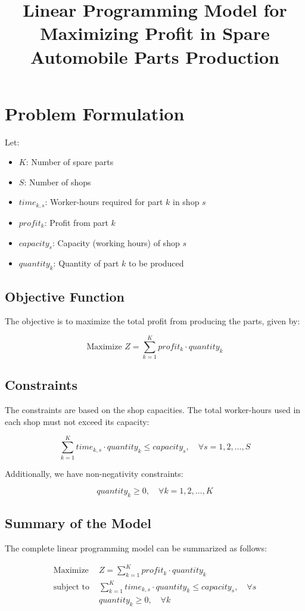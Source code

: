 \documentclass{article}
\begin{document}
\title{Linear Programming Model for Maximizing Profit in Spare Automobile Parts Production}
\author{}
\date{}
\maketitle

\section*{Problem Formulation}

Let:
\begin{itemize}
    \item \( K \): Number of spare parts
    \item \( S \): Number of shops
    \item \( time_{k,s} \): Worker-hours required for part \( k \) in shop \( s \)
    \item \( profit_{k} \): Profit from part \( k \)
    \item \( capacity_{s} \): Capacity (working hours) of shop \( s \)
    \item \( quantity_{k} \): Quantity of part \( k \) to be produced
\end{itemize}

\subsection*{Objective Function}

The objective is to maximize the total profit from producing the parts, given by:

\[
\text{Maximize } Z = \sum_{k=1}^{K} profit_{k} \cdot quantity_{k}
\]

\subsection*{Constraints}

The constraints are based on the shop capacities. The total worker-hours used in each shop must not exceed its capacity:

\[
\sum_{k=1}^{K} time_{k,s} \cdot quantity_{k} \leq capacity_{s}, \quad \forall s = 1, 2, \ldots, S
\]

Additionally, we have non-negativity constraints:

\[
quantity_{k} \geq 0, \quad \forall k = 1, 2, \ldots, K
\]

\subsection*{Summary of the Model}

The complete linear programming model can be summarized as follows:

\[
\begin{align*}
\text{Maximize } & Z = \sum_{k=1}^{K} profit_{k} \cdot quantity_{k} \\
\text{subject to } & \sum_{k=1}^{K} time_{k,s} \cdot quantity_{k} \leq capacity_{s}, \quad \forall s \\
& quantity_{k} \geq 0, \quad \forall k
\end{align*}
\]
\end{document}
